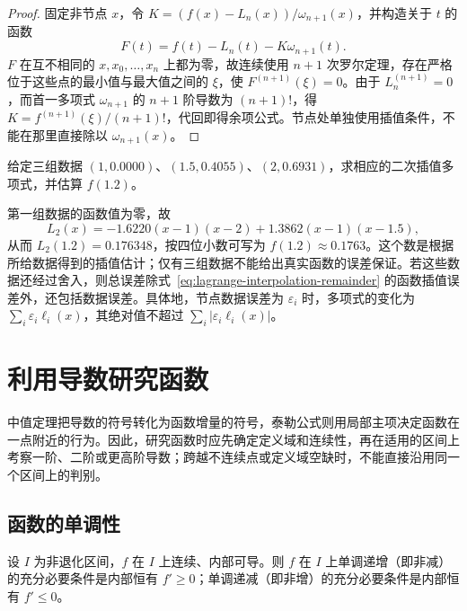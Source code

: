 \begin{proof}
固定非节点 $x$，令 $K=(f(x)-L_n(x))/\omega_{n+1}(x)$，并构造关于 $t$ 的函数
\[
    F(t)=f(t)-L_n(t)-K\omega_{n+1}(t).
\]
$F$ 在互不相同的 $x,x_0,\ldots,x_n$ 上都为零，故连续使用 $n+1$ 次罗尔定理，存在严格位于这些点的最小值与最大值之间的 $\xi$，使 $F^{(n+1)}(\xi)=0$。由于 $L_n^{(n+1)}=0$，而首一多项式 $\omega_{n+1}$ 的 $n+1$ 阶导数为 $(n+1)!$，得 $K=f^{(n+1)}(\xi)/(n+1)!$，代回即得余项公式。节点处单独使用插值条件，不能在那里直接除以 $\omega_{n+1}(x)$。
\end{proof}

\begin{example}
\label{ex:quadratic-interpolation-data}
给定三组数据 $(1,0.0000)$、$(1.5,0.4055)$、$(2,0.6931)$，求相应的二次插值多项式，并估算 $f(1.2)$。
\end{example}

\begin{solve}
第一组数据的函数值为零，故
\[
    L_2(x)=-1.6220(x-1)(x-2)+1.3862(x-1)(x-1.5),
\]
从而 $L_2(1.2)=0.176348$，按四位小数可写为 $f(1.2)\approx0.1763$。这个数是根据所给数据得到的插值估计；仅有三组数据不能给出真实函数的误差保证。若这些数据还经过舍入，则总误差除式~\eqref{eq:lagrange-interpolation-remainder} 的函数插值误差外，还包括数据误差。具体地，节点数据误差为 $\varepsilon_i$ 时，多项式的变化为 $\sum_i\varepsilon_i\ell_i(x)$，其绝对值不超过 $\sum_i|\varepsilon_i\ell_i(x)|$。
\end{solve}

\section{利用导数研究函数}
\label{sec:studying-functions-with-derivatives}

中值定理把导数的符号转化为函数增量的符号，泰勒公式则用局部主项决定函数在一点附近的行为。因此，研究函数时应先确定定义域和连续性，再在适用的区间上考察一阶、二阶或更高阶导数；跨越不连续点或定义域空缺时，不能直接沿用同一个区间上的判别。

\subsection{函数的单调性}
\label{subsec:derivative-tests-for-monotonicity}

\begin{theorem}[单调性的导数判别]
\label{thm:derivative-monotonicity-test}
设 $I$ 为非退化区间，$f$ 在 $I$ 上连续、内部可导。则 $f$ 在 $I$ 上单调递增（即非减）的充分必要条件是内部恒有 $f'\geq0$；单调递减（即非增）的充分必要条件是内部恒有 $f'\leq0$。
\end{theorem}

